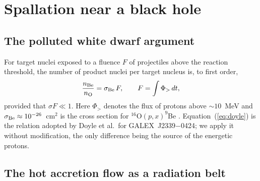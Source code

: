 \documentclass[twocolumn,showpacs,preprintnumbers,amsmath,amssymb]{revtex4}
\begin{document}
\section{\label{sec:background} Spallation near a black hole}

\subsection{The polluted white dwarf argument}

For target nuclei exposed to a fluence $F$ of projectiles above the reaction threshold, the number of product nuclei per target nucleus is, to first order,
\begin{equation}
\label{eq:doyle}
\frac{n_{\rm Be}}{n_{\rm O}} = \sigma_{\rm Be}\,F , \qquad F = \int \Phi_{>}\,dt ,
\end{equation}
provided that $\sigma F \ll 1$. Here $\Phi_{>}$ denotes the flux of protons above $\sim 10$~MeV and $\sigma_{\rm Be}\approx 10^{-26}$~cm$^2$ is the cross section for $^{16}$O$(p,x)^{9}$Be \cite{Doyle_2021}. Equation~(\ref{eq:doyle}) is the relation adopted by Doyle et al.\ for GALEX~J2339$-$0424; we apply it without modification, the only difference being the source of the energetic protons.

\subsection{The hot accretion flow as a radiation belt}
\end{document}
